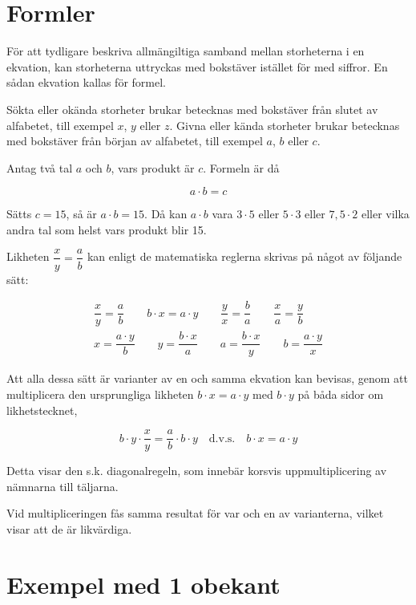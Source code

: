 \section{Formler}

För att tydligare beskriva allmängiltiga samband mellan storheterna i en
ekvation, kan storheterna uttryckas med bokstäver istället för med siffror.
En sådan ekvation kallas för formel.

Sökta eller okända storheter brukar betecknas med bokstäver från slutet av
alfabetet, till exempel $x$, $y$ eller $z$.
Givna eller kända storheter brukar betecknas med bokstäver från början av
alfabetet, till exempel $a$, $b$ eller $c$.

Antag två tal $a$ och $b$, vars produkt är $c$.
Formeln är då

$$a \cdot b = c$$

Sätts \(c = 15\), så är \(a \cdot b = 15\). Då kan \(a \cdot b\) vara \(3 \cdot
5\) eller \(5 \cdot 3\) eller \(7,5 \cdot 2\) eller vilka andra tal som helst
vars produkt blir 15.

Likheten \(\dfrac{x}{y} = \dfrac{a}{b}\) kan enligt de matematiska reglerna
skrivas på något av följande sätt:

\begin{gather*}
  \dfrac{x}{y} = \dfrac{a}{b} \qquad
b \cdot x = a \cdot y \qquad
\dfrac{y}{x} = \dfrac{b}{a} \qquad
\dfrac{x}{a} = \dfrac{y}{b} \\
x = \dfrac{a \cdot y}{b} \qquad
y = \dfrac{b \cdot x}{a} \qquad
a = \dfrac{b \cdot x}{y} \qquad
b = \dfrac{a \cdot y}{x}
\end{gather*}

Att alla dessa sätt är varianter av en och samma ekvation kan bevisas, genom att
multiplicera den ursprungliga likheten \(b \cdot x = a \cdot y\) med \(b \cdot
y\) på båda sidor om likhetstecknet,

\[
b \cdot y \cdot \frac{x}{y} = \frac{a}{b} \cdot b \cdot y \quad \text{d.v.s.}
\quad b \cdot x = a \cdot y
\]

Detta visar den s.k. diagonalregeln, som innebär korsvis uppmultiplicering av
nämnarna till täljarna.

Vid multipliceringen fås samma resultat för var och en av varianterna, vilket
visar att de är likvärdiga.

\section{Exempel med 1 obekant}

